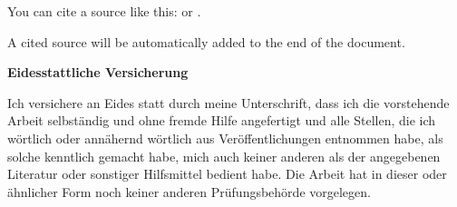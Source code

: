 \documentclass[11pt,]{article}
\begin{document}
You can cite a source like this: \autocite{Keil_2012} or
\textcite{Litterman1986}.

A cited source will be automatically added to the end of the document.

\pagebreak
\renewcommand*{\mkbibnamefamily}[1]{\textbf{#1}}
\renewcommand*{\mkbibnamegiven}[1]{\textbf{#1}}
\renewcommand*{\mkbibnameprefix}[1]{\textbf{#1}}
\renewcommand*{\mkbibnamesuffix}[1]{\textbf{#1}}
\printbibliography[title=References]

\newpage
\textbf{Eidesstattliche Versicherung}

\bigskip

Ich versichere an Eides statt durch meine Unterschrift, dass ich die vorstehende Arbeit selbständig und ohne fremde Hilfe angefertigt und alle Stellen, die ich wörtlich oder annähernd wörtlich aus Veröffentlichungen entnommen habe, als solche kenntlich gemacht habe, mich auch keiner anderen als der angegebenen Literatur oder sonstiger Hilfsmittel bedient habe. Die Arbeit hat in dieser oder ähnlicher Form noch keiner anderen Prüfungsbehörde vorgelegen.

\vspace{1cm}
\rule{0pt}{2\baselineskip} %
\par\noindent{} \hfill\makebox[2.25in]{\hrulefill}%
\par\noindent\makebox[2.25in][l]{} \hfill{}%
\end{document}
